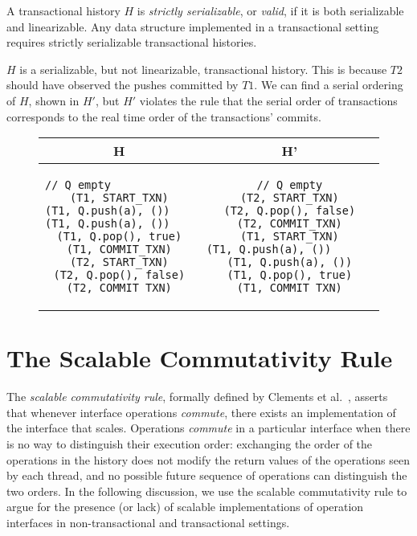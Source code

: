 \begin{defn}
    A transactional history $H$ is \emph{strictly serializable}, or \emph{valid}, if it is both serializable and linearizable. Any data structure implemented in a transactional setting requires strictly serializable transactional histories.
\end{defn}

\begin{eg}
$H$ is a serializable, but not linearizable, transactional history. This is because $T2$ should have observed the pushes committed by $T1$. We can find a serial ordering of $H$, shown in $H'$, but $H'$ violates the rule that the serial order of transactions corresponds to the real time order of the transactions' commits.
    
\begin{figure}[H]
    \centering
\singlespacing   
    \begin{tabular}{c|c}
H & H'\\
\hline
\begin{lstlisting}
// Q empty                          
(T1, START_TXN)
(T1, Q.push(a), ())                
(T1, Q.push(a), ())               
(T1, Q.pop(), true)
(T1, COMMIT_TXN)
(T2, START_TXN)
(T2, Q.pop(), false)
(T2, COMMIT_TXN)
\end{lstlisting} & 
\begin{lstlisting}
// Q empty
(T2, START_TXN)
(T2, Q.pop(), false)
(T2, COMMIT_TXN)
(T1, START_TXN)
(T1, Q.push(a), ())                       
(T1, Q.push(a), ())
(T1, Q.pop(), true)
(T1, COMMIT_TXN)
\end{lstlisting}
    \end{tabular}
\end{figure}
\end{eg}

\section{The Scalable Commutativity Rule}
\label{com_scale}

The \emph{scalable commutativity rule}, formally defined by Clements et al.~\cite{scrule}, asserts that whenever interface operations \emph{commute}, there exists an implementation of the interface that scales.
Operations \emph{commute} in a particular interface when there is no way to distinguish their execution order: exchanging the order of the operations in the history does not modify the return values of the operations seen by each thread, and no possible future sequence of operations can distinguish the two orders. In the following discussion, we use the scalable commutativity rule to argue for the presence (or lack) of scalable implementations of operation interfaces in non-transactional and transactional settings.

